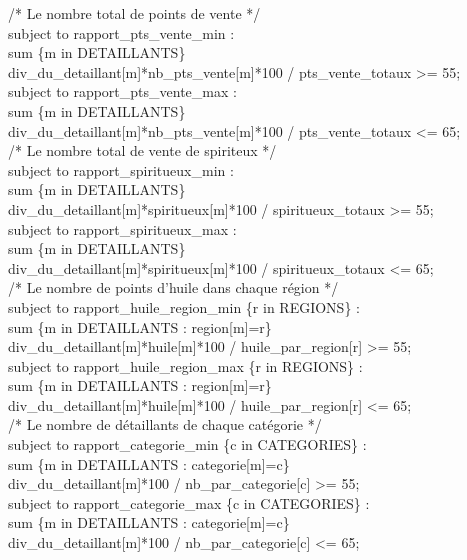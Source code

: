 \documentclass[a4paper,12pt,oneside]{report}
\begin{document}
/* Le nombre total de points de vente */\\
subject to rapport\_pts\_vente\_min :\\
	sum \{m in DETAILLANTS\}\\
	div\_du\_detaillant[m]*nb\_pts\_vente[m]*100 / pts\_vente\_totaux >= 55;\\

subject to rapport\_pts\_vente\_max :\\
	sum \{m in DETAILLANTS\}\\
	div\_du\_detaillant[m]*nb\_pts\_vente[m]*100 / pts\_vente\_totaux <= 65;\\

/* Le nombre total de vente de spiriteux */\\
subject to rapport\_spiritueux\_min :\\
	sum \{m in DETAILLANTS\}\\
	div\_du\_detaillant[m]*spiritueux[m]*100 / spiritueux\_totaux >= 55;\\

subject to rapport\_spiritueux\_max :\\
	sum \{m in DETAILLANTS\}\\
	div\_du\_detaillant[m]*spiritueux[m]*100 / spiritueux\_totaux <= 65;\\

/* Le nombre de points d'huile dans chaque région */\\
subject to rapport\_huile\_region\_min \{r in REGIONS\} :\\
	sum \{m in DETAILLANTS : region[m]=r\}\\
	div\_du\_detaillant[m]*huile[m]*100 / huile\_par\_region[r] >= 55;\\

subject to rapport\_huile\_region\_max \{r in REGIONS\} :\\
	sum \{m in DETAILLANTS : region[m]=r\}\\
	div\_du\_detaillant[m]*huile[m]*100 / huile\_par\_region[r] <= 65;\\

/* Le nombre de détaillants de chaque catégorie */\\
subject to rapport\_categorie\_min \{c in CATEGORIES\} :\\
	sum \{m in DETAILLANTS : categorie[m]=c\}\\
	div\_du\_detaillant[m]*100 / nb\_par\_categorie[c] >= 55;\\

subject to rapport\_categorie\_max \{c in CATEGORIES\} :\\
	sum \{m in DETAILLANTS : categorie[m]=c\}\\
	div\_du\_detaillant[m]*100 / nb\_par\_categorie[c] <= 65;\\
\end{document}
